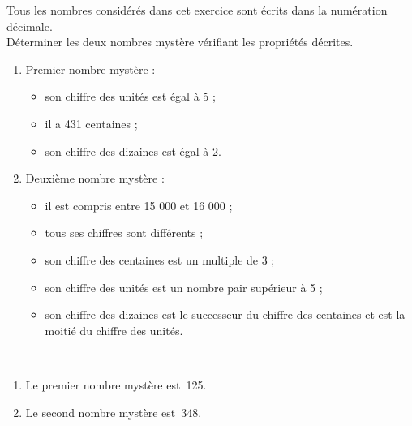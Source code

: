 \bigskip


\begin{exercice} %
   Tous les nombres considérés dans cet exercice sont écrits dans la numération décimale. \\
   Déterminer les deux nombres mystère vérifiant les propriétés décrites.
\begin{enumerate}
   \item Premier nombre mystère :
      \begin{itemize}
         \item son chiffre des unités est égal à 5 ;
         \item il a 431 centaines ;
         \item son chiffre des dizaines est égal à 2.
      \end{itemize}
   \item Deuxième nombre mystère :
      \begin{itemize}
         \item il est compris entre 15 000 et 16 000 ;
         \item tous ses chiffres sont différents ;
         \item son chiffre des centaines est un multiple de 3 ;
         \item son chiffre des unités est un nombre pair supérieur à 5 ;
         \item son chiffre des dizaines est le successeur du chiffre des centaines et est la moitié du chiffre des unités.
      \end{itemize}
   \end{enumerate}
\end{exercice}

\begin{corrige}
\ \\ [-5mm]
   \begin{enumerate}
      \item Le premier nombre mystère est {\,125}.
      \item Le second nombre mystère est {\,348}.
   \end{enumerate}
\end{corrige}


\bigskip


